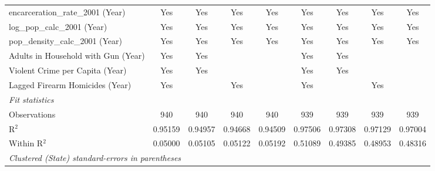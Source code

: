 \begin{tabular}{lcccccccc}
   encarceration\_rate\_2001 (Year)    & Yes              & Yes              & Yes              & Yes              & Yes              & Yes              & Yes              & Yes\\  
   log\_pop\_calc\_2001 (Year)         & Yes              & Yes              & Yes              & Yes              & Yes              & Yes              & Yes              & Yes\\  
   pop\_density\_calc\_2001 (Year)     & Yes              & Yes              & Yes              & Yes              & Yes              & Yes              & Yes              & Yes\\  
   Adults in Household with Gun (Year) & Yes              & Yes              &                  &                  & Yes              & Yes              &                  & \\  
   Violent Crime per Capita (Year)     & Yes              & Yes              &                  &                  & Yes              & Yes              &                  & \\  
   Lagged Firearm Homicides (Year)     & Yes              &                  & Yes              &                  & Yes              &                  & Yes              & \\  
   \midrule
   \emph{Fit statistics}\\
   Observations                        & 940              & 940              & 940              & 940              & 939              & 939              & 939              & 939\\  
   R$^2$                               & 0.95159          & 0.94957          & 0.94668          & 0.94509          & 0.97506          & 0.97308          & 0.97129          & 0.97004\\  
   Within R$^2$                        & 0.05000          & 0.05105          & 0.05122          & 0.05192          & 0.51089          & 0.49385          & 0.48953          & 0.48316\\  
   \midrule \midrule
   \multicolumn{9}{l}{\emph{Clustered (State) standard-errors in parentheses}}\\
\end{tabular}
\par\endgroup


